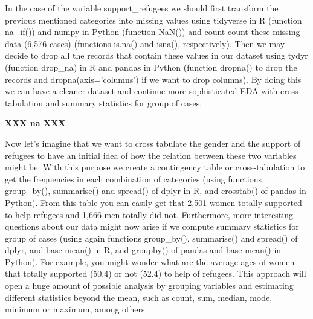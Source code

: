 In the case of the variable support\_refugees we should first transform the previous mentioned categories into missing values using tidyverse in R (function na\_if()) and numpy in Python (function NaN()) and count count these missing data (6,576 cases) (functions is.na() and isna(), respectively).   Then we may decide to drop all the records that contain these values in our dataset using tydyr (function drop\_na) in R and pandas in Python (function dropna() to drop the records and dropna(axis='columns') if we want to drop columns). By doing this we can have a cleaner dataset and continue more sophisticated EDA with cross-tabulation and summary statistics for group of cases.	

\textbf{XXX  na  XXX}


Now let's imagine that we want to cross tabulate the gender and the support of refugees to have an initial idea of how the relation between these two variables might be. With this purpose we create a contingency table or cross-tabulation to get the frequencies in each combination of categories (using functions group\_by(), summarise() and spread() of dplyr in R, and crosstab() of pandas in Python). From this table you can easily get that 2,501 women totally supported to help refugees and 1,666 men totally did not.  Furthermore, more interesting questions about our data might now arise if we compute summary statistics for group of cases (using again functions group\_by(), summarise() and spread() of dplyr, and base mean() in R, and groupby() of pandas and base mean() in Python). For example, you might wonder what are the average ages of women that totally supported (50.4) or not (52.4) to help of refugees.  This approach will open a huge amount of possible analysis by grouping variables and estimating different statistics beyond the mean, such as count, sum, median, mode, minimum or maximum, among others.